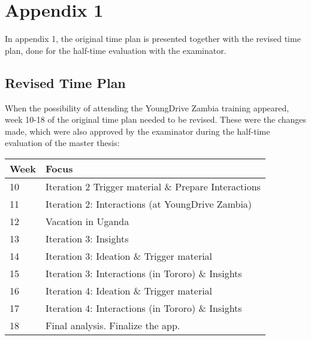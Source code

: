 \chapter{Appendix 1}\label{cha:appendix1}


In appendix 1, the original time plan is presented together with the revised time plan, done for the half-time evaluation with the examinator.



\section{Revised Time Plan}

When the possibility of attending the YoungDrive Zambia training appeared, week 10-18 of the original time plan needed to be revised. These were the changes made, which were also approved by the examinator during the half-time evaluation of the master thesis:

\begin{center}
    \begin{tabular}{ | l | p{10cm} |}
    \hline
    Week & Focus \\ \hline
    10 & Iteration 2 Trigger material \& Prepare Interactions \\ \hline
    11 & Iteration 2: Interactions (at YoungDrive Zambia) \\ \hline
    12 & Vacation in Uganda \\ \hline
    13 & Iteration 3: Insights \\ \hline
    14 & Iteration 3: Ideation \& Trigger material \\ \hline
    15 & Iteration 3: Interactions (in Tororo) \& Insights \\ \hline
    16 & Iteration 4: Ideation \& Trigger material \\ \hline
    17 & Iteration 4: Interactions (in Tororo) \& Insights \\ \hline
    18 & Final analysis. Finalize the app. \\ \hline
    \end{tabular}
\end{center}

